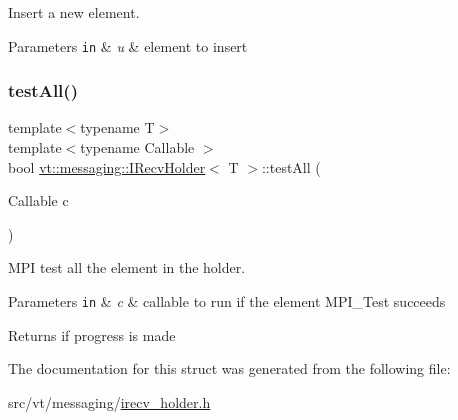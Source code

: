 Insert a new element. 


\begin{DoxyParams}[1]{Parameters}
\mbox{\tt in}  & {\em u} & element to insert \\
\hline
\end{DoxyParams}
\mbox{\label{structvt_1_1messaging_1_1_i_recv_holder_a5c25ae9371ef928b00c42405d9d00a38}} 
\subsubsection{\texorpdfstring{test\+All()}{testAll()}}
{\footnotesize\ttfamily template$<$typename T$>$ \\
template$<$typename Callable $>$ \\
bool \hyperlink{structvt_1_1messaging_1_1_i_recv_holder}{vt\+::messaging\+::\+I\+Recv\+Holder}$<$ T $>$\+::test\+All (\begin{DoxyParamCaption}\item[{Callable}]{c }\end{DoxyParamCaption})\hspace{0.3cm}{\ttfamily [inline]}}



M\+PI test all the element in the holder. 


\begin{DoxyParams}[1]{Parameters}
\mbox{\tt in}  & {\em c} & callable to run if the element {\ttfamily M\+P\+I\+\_\+\+Test} succeeds\\
\hline
\end{DoxyParams}
\begin{DoxyReturn}{Returns}
if progress is made 
\end{DoxyReturn}


The documentation for this struct was generated from the following file\+:\begin{DoxyCompactItemize}
\item 
src/vt/messaging/\hyperlink{irecv__holder_8h}{irecv\+\_\+holder.\+h}\end{DoxyCompactItemize}
